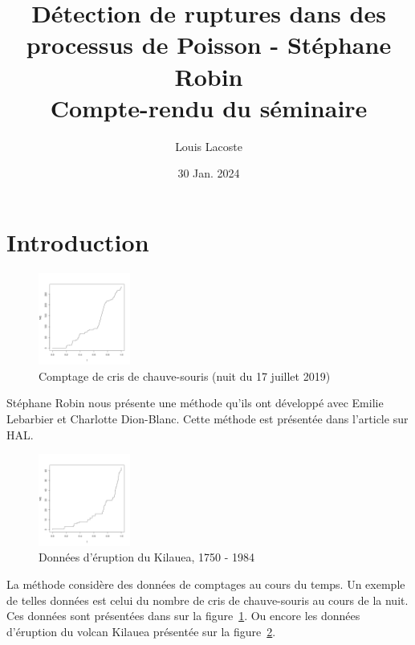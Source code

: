 \documentclass[a4paper,10pt]{article}\usepackage[]{graphicx}\usepackage[]{xcolor}
\title{\vspace{-1.5cm}\large Détection de ruptures dans des processus de Poisson - Stéphane Robin\\
\small Compte-rendu du séminaire\vspace{-0.5cm}}
\date{\small 30 Jan. 2024}
\author{\small Louis Lacoste}
\begin{document}
\maketitle

\section{Introduction}

\begin{figure}
    \centering
    \vspace{-5pt}
    \includegraphics[width=0.27\textwidth]{graph-cris-chauve-souris}
    \vspace{-20pt}
    \caption{\small Comptage de cris de chauve-souris (nuit du 17 juillet 2019)}
    \label{fig:graph-cris-chauve-souris}
\end{figure}

Stéphane Robin nous présente une méthode qu'ils ont développé avec Emilie Lebarbier
et Charlotte Dion-Blanc. Cette méthode est présentée dans l'article 
\cite{dion-blancDetectionRupturesMultiples2023} sur HAL.

\begin{figure}
    \centering
    \vspace{-20pt}
    \includegraphics[width=0.27\textwidth]{graph-eruption-kilauea}
    \vspace{-20pt}
    \caption{Données d'éruption du Kilauea, 1750 - 1984}
    \label{fig:graph-eruption-kilauea}
\end{figure}

La méthode considère des données de comptages au cours du temps. Un exemple de 
telles données est celui du nombre de cris de chauve-souris au cours de la nuit.
Ces données sont présentées dans sur la figure~\ref{fig:graph-cris-chauve-souris}.
Ou encore les données d'éruption du volcan Kilauea présentée sur la figure~\ref{fig:graph-eruption-kilauea}.
\end{document}
